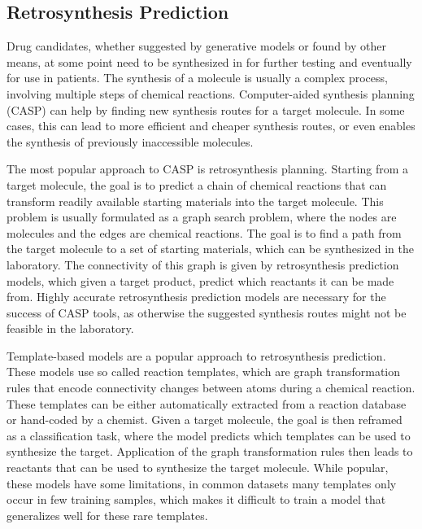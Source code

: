 \subsection{Retrosynthesis Prediction\label{sec:retrosynthesis}}
Drug candidates, whether suggested by generative models or found by other means,
at some point need to be synthesized in for further testing and 
eventually for use in patients. The synthesis of a molecule is usually a complex
process, involving multiple steps of chemical reactions. Computer-aided synthesis 
planning (CASP) can help by finding new synthesis routes for a target molecule.
In some cases, this can lead to more efficient and cheaper synthesis routes, or
even enables the synthesis of previously inaccessible molecules.

The most popular approach to CASP is retrosynthesis planning. Starting from a
target molecule, the goal is to predict a chain of chemical reactions that can
transform readily available starting materials into the target molecule. This
problem is usually formulated as a graph search problem, where the nodes are
molecules and the edges are chemical reactions. The goal is to find a path from
the target molecule to a set of starting materials, which can be synthesized in
the laboratory. The connectivity of this graph is given by retrosynthesis
prediction models, which given a target product, predict which reactants it can
be made from. Highly accurate retrosynthesis prediction models are necessary for
the success of CASP tools, as otherwise the suggested synthesis routes might not
be feasible in the laboratory.

Template-based models are a popular approach to retrosynthesis prediction. These
models use so called reaction templates, which are graph transformation rules 
that encode connectivity changes between atoms during a chemical reaction. These 
templates can be either automatically extracted from a reaction database or
hand-coded by a chemist. Given a target molecule, the goal is then reframed as a
classification task, where the model predicts which templates can be used to
synthesize the target. Application of the graph transformation rules then leads
to reactants that can be used to synthesize the target molecule. While popular, 
these models have some limitations, in common datasets many templates only occur 
in few training samples, which makes it difficult to train a model that generalizes
well for these rare templates.

